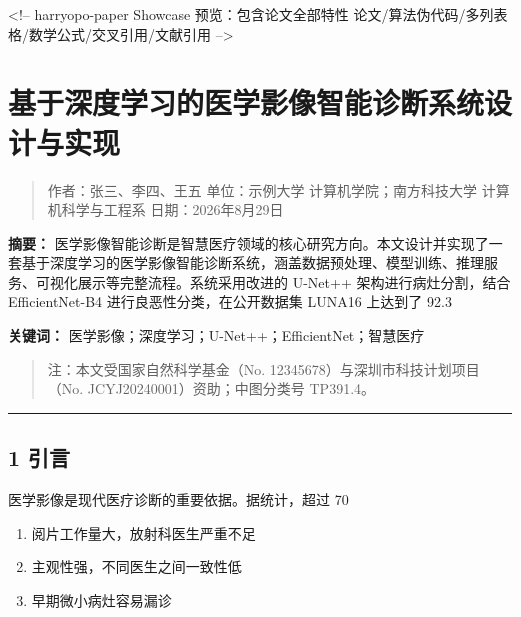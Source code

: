 \documentclass{harryopo-mathnotes}
\date{\today}
\begin{document}
\maketitle
\thispagestyle{empty}
\cleardoublepage

\strictpagecheck
\setcounter{page}{1}
\restoregeometry
\onehalfspacing

<!-- harryopo-paper Showcase 预览：包含论文全部特性
     论文/算法伪代码/多列表格/数学公式/交叉引用/文献引用
-->

\section{基于深度学习的医学影像智能诊断系统设计与实现}

\begin{quote}
作者：张三、李四、王五
单位：示例大学 计算机学院；南方科技大学 计算机科学与工程系
日期：2026年8月29日
\end{quote}

\textbf{摘要：} 医学影像智能诊断是智慧医疗领域的核心研究方向。本文设计并实现了一套基于深度学习的医学影像智能诊断系统，涵盖数据预处理、模型训练、推理服务、可视化展示等完整流程。系统采用改进的 U-Net++ 架构进行病灶分割，结合 EfficientNet-B4 进行良恶性分类，在公开数据集 LUNA16 上达到了 92.3%

\textbf{关键词：} 医学影像；深度学习；U-Net++；EfficientNet；智慧医疗

\begin{quote}
注：本文受国家自然科学基金（No. 12345678）与深圳市科技计划项目（No. JCYJ20240001）资助；中图分类号 TP391.4。
\end{quote}

\medskip\hrule\medskip

\subsection{1 引言}

医学影像是现代医疗诊断的重要依据。据统计，超过 70%

\begin{enumerate}
  \item 阅片工作量大，放射科医生严重不足
  \item 主观性强，不同医生之间一致性低
  \item 早期微小病灶容易漏诊
\end{enumerate}
\end{document}
